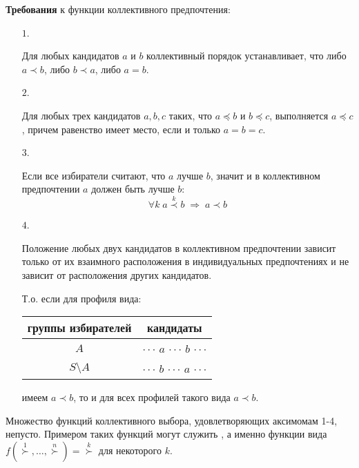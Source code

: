 \textbf{Требования} к функции коллективного предпочтения:
\begin{itemize}
	\item[$1$.]

		Для любых кандидатов $a$ и $b$ коллективный порядок устанавливает, что либо $a \prec b$, либо $b \prec a$, либо $a = b$.
	\item[$2$.]

		Для любых трех кандидатов $a, b, c$ таких, что $a \preceq b$ и $b \preceq c$, выполняется $a \preceq c$, причем равенство имеет место, если и только $a = b = c$.
	\item[$3$.]

		Если все избиратели считают, что $a$ лучше $b$, значит и в коллективном предпочтении $a$ должен быть лучше $b$:
		$$\forall k \; a \overset{k}{\prec} b \; \Rightarrow \; a \prec b$$
	\item[$4$.]

		Положение любых двух кандидатов в коллективном предпочтении зависит только от их взаимного расположения в индивидуальных предпочтениях и не зависит от расположения других кандидатов. 

		Т.о. если для профиля вида:
		\begin{tabular}{ | c | c | }
			\hline
				группы избирателей & кандидаты \\ \hline
				$A$ & $\cdot \cdot \cdot$ $a$ $\cdot \cdot \cdot$ $b$ $\cdot \cdot \cdot$ \\
				$S \setminus A$ & $\cdot \cdot \cdot$ $b$ $\cdot \cdot \cdot$ $a$ $\cdot \cdot \cdot$ \\
			\hline
		\end{tabular}
		имеем $a \prec b$, то и для всех профилей такого вида $a \prec b$.
\end{itemize}

\begin{remark}\label{cha:5/remark:1}
	Множество функций коллективного выбора, удовлетворяющих аксимомам 1-4, непусто. Примером таких функций могут служить , а именно функции вида $f(\overset{1}{\succ}, \dots, \overset{n}{\succ}) = \overset{k}{\succ}$ для некоторого $k$. 
\end{remark}

